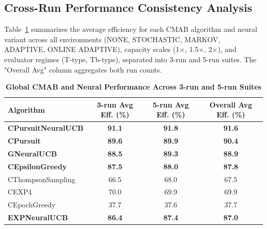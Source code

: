 \documentclass[12pt,a4paper]{article}
\newcommand{\performance}[1]{\textcolor{performancecolor}{\textbf{#1}}}
\newcommand{\legacy}[1]{\textcolor{legacycolor}{\textbf{#1}}}
\newcommand{\neural}[1]{\textcolor{neuralcolor}{\textbf{#1}}}
\begin{document}
\begin{tcolorbox}[colback=performancecolor!10,colframe=performancecolor,title=\textbf{Primary Performance Results (Aggregated Across Capacities, Environments, and Regimes)}]

\subsection{Cross-Run Performance Consistency Analysis}

Table~\ref{tab:global-performance} summarizes the average efficiency for each CMAB algorithm and neural variant across all environments (NONE, STOCHASTIC, MARKOV, ADAPTIVE, ONLINE ADAPTIVE), capacity scales (1$\times$, 1.5$\times$, 2$\times$), and evaluator regimes (T-type, Tb-type), separated into 3-run and 5-run suites. The "Overall Avg" column aggregates both run counts.

\begin{table}[H]
\centering
\caption{\performance{Global CMAB and Neural Performance Across 3-run and 5-run Suites}}
\label{tab:global-performance}
\begin{tabular}{|l|c|c|c|}
\hline
\textbf{Algorithm} & \textbf{3-run Avg Eff. (\%)} & \textbf{5-run Avg Eff. (\%)} & \textbf{Overall Avg Eff. (\%)} \\
\hline
\hline
\neural{CPursuitNeuralUCB}   & \neural{91.1}     & \neural{91.8}     & \neural{\textbf{91.6}} \\
\performance{CPursuit}        & \performance{89.6} & \performance{89.9} & \performance{\textbf{90.4}} \\
\neural{GNeuralUCB}          & \neural{88.5}     & \neural{89.3}     & \neural{\textbf{88.9}} \\
\performance{CEpsilonGreedy} & \performance{87.5} & \performance{88.0} & \performance{\textbf{87.8}} \\
CThompsonSampling            & 66.5              & 68.0              & 67.5 \\
CEXP4                        & 70.0              & 69.9              & 69.9 \\
CEpochGreedy                 & 37.7              & 37.6              & 37.7 \\
\legacy{EXPNeuralUCB}        & \legacy{86.4}     & \legacy{87.4}     & \legacy{87.0} \\
\hline
\end{tabular}
\end{table}


\end{tcolorbox}
\end{document}
